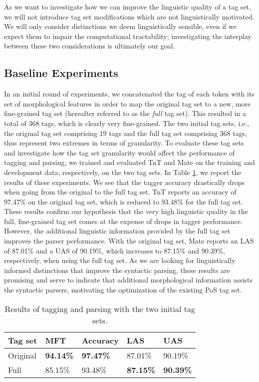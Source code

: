 \documentclass[11pt,a4paper]{article}
\begin{document}
As we want to investigate how we can improve the
linguistic quality of a tag set, we will not introduce tag set modifications
which are not linguistically motivated. We will only consider distinctions we
deem linguistically sensible, even if we expect them to impair the
computational tractability; investigating the interplay between these two
considerations is ultimately our goal.

\subsection{Baseline Experiments}
In an initial round of experiments, we concatenated the tag of each token with
its set of morphological features in order to map the original tag set to a
new, more fine-grained tag set (hereafter referred to as the \emph{full} tag
set). This resulted in a total of 368 tags, which is clearly very fine-grained.
The two initial tag sets, i.e., the original tag set comprising 19 tags and the
full tag set comprising 368 tags, thus represent two extremes in terms of
granularity.  To evaluate these tag sets and investigate how the tag set
granularity would affect the performance of tagging and parsing, we trained and
evaluated TnT and Mate on the training and development data, respectively, on
the two tag sets. In Table \ref{inittagseteval}, we report the results of these
experiments. We see that the tagger accuracy drastically drops when going from
the original to the full tag set. TnT reports an accuracy of 97.47\% on the
original tag set, which is reduced to 93.48\% for the full tag set. These
results confirm our hypothesis that the very high linguistic quality in the
full, fine-grained tag set comes at the expense of drops in tagger performance.
However, the additional linguistic information provided by the full tag set
improves the parser performance. With the original tag set, Mate reports an LAS
of 87.01\% and a UAS of 90.19\%, which increases to 87.15\% and 90.39\%,
respectively, when using the full tag set. As we are looking for linguistically
informed distinctions that improve the syntactic parsing, these results are
promising and serve to indicate that additional morphological information
assists the syntactic parsers, motivating the optimization of the existing PoS
tag set.

\begin{table}
    \centering
    \smaller[0.5]
    \begin{tabular}{@{}lllll@{}}
        \toprule
        \textbf{Tag set} & \textbf{MFT} & \textbf{Accuracy} &
        \textbf{LAS} & \textbf{UAS} \\
        \midrule
        Original & \textbf{94.14\%} & \textbf{97.47\%} & 87.01\% & 90.19\% \\
        Full & 85.15\% & 93.48\% & \textbf{87.15\%} & \textbf{90.39\%} \\
        \bottomrule
    \end{tabular}
    \caption{Results of tagging and parsing with the two initial tag sets.}
    \label{inittagseteval}
\end{table}
\end{document}
